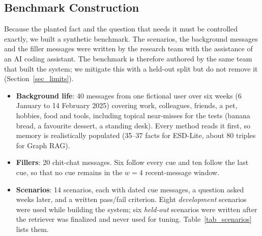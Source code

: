 \documentclass[conference]{IEEEtran}
\begin{document}
\subsection{Benchmark Construction}
Because the planted fact and the question that needs it must be controlled exactly, we built a synthetic benchmark. The scenarios, the background messages and the filler messages were written by the research team with the assistance of an AI coding assistant. The benchmark is therefore authored by the same team that built the system; we mitigate this with a held-out split but do not remove it (Section~\ref{sec_limits}).
\begin{itemize}
\item \textbf{Background life}: 40 messages from one fictional user over six weeks (6 January to 14 February 2025) covering work, colleagues, friends, a pet, hobbies, food and tools, including topical near-misses for the tests (banana bread, a favourite dessert, a standing desk). Every method reads it first, so memory is realistically populated (35--37 facts for ESD-Lite, about 80 triples for Graph RAG).
\item \textbf{Fillers}: 20 chit-chat messages. Six follow every cue and ten follow the last cue, so that no cue remains in the $w = 4$ recent-message window.
\item \textbf{Scenarios}: 14 scenarios, each with dated cue messages, a question asked weeks later, and a written pass/fail criterion. Eight \emph{development} scenarios were used while building the system; six \emph{held-out} scenarios were written after the retriever was finalized and never used for tuning. Table~\ref{tab_scenarios} lists them.
\end{itemize}
\end{document}
